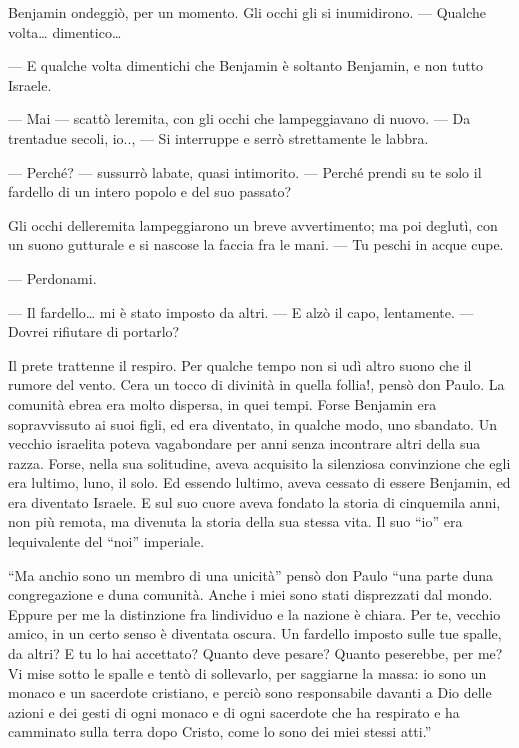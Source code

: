 Benjamin ondeggiò, per un momento. Gli occhi gli si inumidirono. ---
Qualche volta\ldots{} dimentico\ldots{}

--- E qualche volta dimentichi che Benjamin è soltanto Benjamin, e non
tutto Israele.

--- Mai --- scattò l\textquotesingle eremita, con gli occhi che
lampeggiavano di nuovo. --- Da trentadue secoli, io.., --- Si interruppe
e serrò strettamente le labbra.

--- Perché? --- sussurrò l\textquotesingle abate, quasi intimorito. ---
Perché prendi su te solo il fardello di un intero popolo e del suo
passato?

Gli occhi dell\textquotesingle eremita lampeggiarono un breve
avvertimento; ma poi deglutì, con un suono gutturale e si nascose la
faccia fra le mani. --- Tu peschi in acque cupe.

--- Perdonami.

--- Il fardello\ldots{} mi è stato imposto da altri. --- E alzò il capo,
lentamente. --- Dovrei rifiutare di portarlo?

Il prete trattenne il respiro. Per qualche tempo non si udì altro suono
che il rumore del vento. C\textquotesingle era un tocco di divinità in
quella follia!, pensò don Paulo. La comunità ebrea era molto dispersa,
in quei tempi. Forse Benjamin era sopravvissuto ai suoi figli, ed era
diventato, in qualche modo, uno sbandato. Un vecchio israelita poteva
vagabondare per anni senza incontrare altri della sua razza. Forse,
nella sua solitudine, aveva acquisito la silenziosa convinzione che egli
era l\textquotesingle ultimo, l\textquotesingle uno, il solo. Ed essendo
l\textquotesingle ultimo, aveva cessato di essere Benjamin, ed era
diventato Israele. E sul suo cuore aveva fondato la storia di cinquemila
anni, non più remota, ma divenuta la storia della sua stessa vita. Il
suo ``io'' era l\textquotesingle equivalente del ``noi'' imperiale.

``Ma anch\textquotesingle io sono un membro di una unicità'' pensò don
Paulo ``una parte d\textquotesingle una congregazione e
d\textquotesingle una comunità. Anche i miei sono stati disprezzati dal
mondo. Eppure per me la distinzione fra l\textquotesingle individuo e la
nazione è chiara. Per te, vecchio amico, in un certo senso è diventata
oscura. Un fardello imposto sulle tue spalle, da altri? E tu lo hai
accettato? Quanto deve pesare? Quanto peserebbe, per me? Vi mise sotto
le spalle e tentò di sollevarlo, per saggiarne la massa: io sono un
monaco e un sacerdote cristiano, e perciò sono responsabile davanti a
Dio delle azioni e dei gesti di ogni monaco e di ogni sacerdote che ha
respirato e ha camminato sulla terra dopo Cristo, come lo sono dei miei
stessi atti.''


